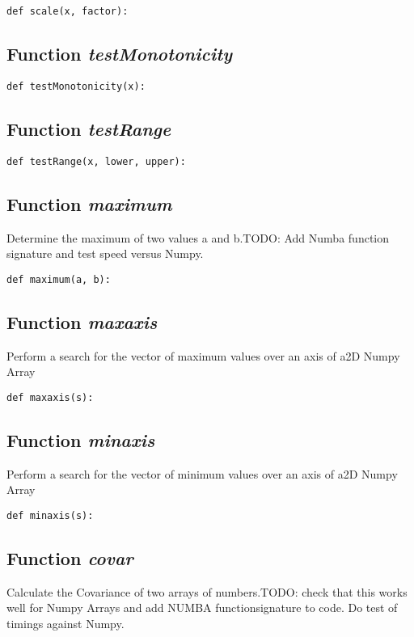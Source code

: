\documentclass[twoside,11pt]{book}
\begin{document}
\begin{lstlisting}
def scale(x, factor):
\end{lstlisting}

\subsection{Function {\it testMonotonicity}}


\begin{lstlisting}
def testMonotonicity(x):
\end{lstlisting}

\subsection{Function {\it testRange}}


\begin{lstlisting}
def testRange(x, lower, upper):
\end{lstlisting}

\subsection{Function {\it maximum}}
Determine the maximum of two values a and b.TODO: Add Numba function signature and test speed versus Numpy. 

\begin{lstlisting}
def maximum(a, b):
\end{lstlisting}

\subsection{Function {\it maxaxis}}
Perform a search for the vector of maximum values over an axis of a2D Numpy Array 

\begin{lstlisting}
def maxaxis(s):
\end{lstlisting}

\subsection{Function {\it minaxis}}
Perform a search for the vector of minimum values over an axis of a2D Numpy Array 

\begin{lstlisting}
def minaxis(s):
\end{lstlisting}

\subsection{Function {\it covar}}
Calculate the Covariance of two arrays of numbers.TODO: check that this works well for Numpy Arrays and add NUMBA functionsignature to code. Do test of timings against Numpy. 
\end{document}
